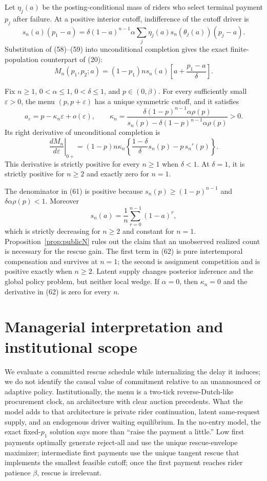\documentclass[mnsc,dblanonrev]{informs4}
\begin{document}
Let $\eta_j(a)$ be the posting-conditional mass of riders who select terminal
payment $p_j$ after failure.  At a positive interior cutoff, indifference of
the cutoff driver is
\[
 s_n(a)(p_1-a)
 =\delta(1-a)^{n-1}\alpha
   \sum_j\eta_j(a)s_n(\theta_j(a))(p_j-a).                  \tag{59}
\]
Substitution of (58)--(59) into unconditional completion gives the exact
finite-population counterpart of (20):
\[
 M_n(p_1,p_2;a)
 =(1-p_1)n s_n(a)\left[a+\frac{p_1-a}\delta\right].       \tag{60}
\]

\begin{proposition}
\label{prop:publicN}
Fix $n\ge1$, $0<\alpha\le1$, $0<\delta\le1$, and
$p\in(0,\beta)$.  For every sufficiently
small $\varepsilon>0$, the menu $(p,p+\varepsilon)$ has a unique symmetric
cutoff, and it satisfies
\[
 a_\varepsilon=p-\kappa_n\varepsilon+o(\varepsilon),
 \qquad
 \kappa_n=
 \frac{\delta(1-p)^{n-1}\alpha\rho(p)}
 {s_n(p)-\delta(1-p)^{n-1}\alpha\rho(p)}>0.                \tag{61}
\]
Its right derivative of unconditional completion is
\[
 \left.\frac{dM_n}{d\varepsilon}\right|_{0+}
 =(1-p)n\kappa_n
 \left\{\frac{1-\delta}{\delta}s_n(p)-p\,s_n'(p)\right\}. \tag{62}
\]
This derivative is strictly positive for every $n\ge1$ when $\delta<1$.
At $\delta=1$, it is strictly positive for $n\ge2$ and exactly zero for
$n=1$.
\end{proposition}

The denominator in (61) is positive because
$s_n(p)\ge(1-p)^{n-1}$ and $\delta\alpha\rho(p)<1$.  Moreover
\[
 s_n(a)=\frac1n\sum_{r=0}^{n-1}(1-a)^r,
\]
which is strictly decreasing for $n\ge2$ and constant for $n=1$.
Proposition~\ref{prop:publicN} rules out the claim that an unobserved realized
count is necessary for the rescue gain.  The first term in (62) is pure
intertemporal compensation and survives at $n=1$; the second is assignment
competition and is positive exactly when $n\ge2$.  Latent supply changes
posterior inference and the global policy problem, but neither local wedge.
If $\alpha=0$, then $\kappa_n=0$ and the derivative in (62) is zero for
every $n$.

\section{Managerial interpretation and institutional scope}
\label{sec:discussion}

We evaluate a committed rescue schedule while internalizing the delay it
induces; we do not identify the causal value of commitment relative to an
unannounced or adaptive policy.  Institutionally, the menu is a two-tick
reverse-Dutch-like procurement clock, an architecture with clear auction
precedents.  What the model adds to that architecture is private rider
continuation, latent same-request supply, and an endogenous driver waiting
equilibrium.  In the no-entry model, the exact fixed-$p_1$ solution says more
than ``raise the payment a little.''  Low first payments optimally generate
reject-all and use the unique rescue-envelope maximizer; intermediate first
payments use the unique tangent rescue that implements the smallest feasible
cutoff; once the first payment reaches rider patience $\beta$, rescue is
irrelevant.
\end{document}
